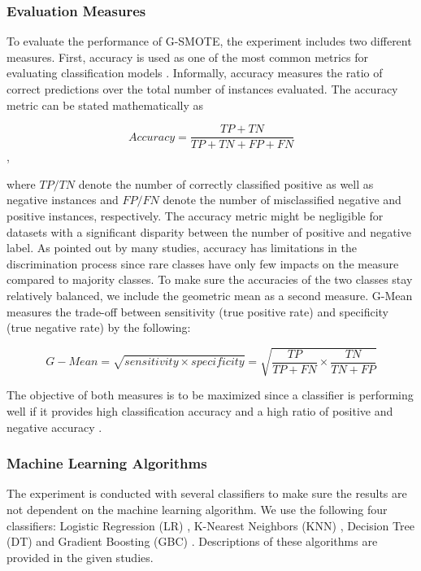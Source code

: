 \documentclass[parskip=full]{scrartcl}
\begin{document}
\subsubsection{Evaluation Measures}

To evaluate the performance of G-SMOTE, the experiment includes two different measures. First, accuracy is used as one of the most common metrics for evaluating classification models \cite{M.2015}. Informally, accuracy measures the ratio of correct predictions over the total number of instances evaluated. The accuracy metric can be stated mathematically as

\[Accuracy = \frac{TP + TN}{TP + TN + FP + FN}\],

where $\mathit{TP/TN}$ denote the number of correctly classified positive as well as negative instances and $\mathit{FP/FN}$ denote the number of misclassified negative and positive instances, respectively. The accuracy metric might be negligible for datasets with a significant disparity between the number of positive and negative label. As pointed out by many studies, accuracy has limitations in the discrimination process since rare classes have only few impacts on the measure compared to majority classes. To make sure the accuracies of the two classes stay relatively balanced, we include the geometric mean as a second measure. G-Mean measures the trade-off between sensitivity (true positive rate) and specificity (true negative rate) by the following:

\[G-Mean = \sqrt{sensitivity \times specificity} = \sqrt{\dfrac{TP}{TP + FN} \times \dfrac{TN}{TN + FP}}\]

The objective of both measures is to be maximized since a classifier is performing well if it provides high classification accuracy and a high ratio of positive and negative accuracy \cite{Han.2012}. 

\subsubsection{Machine Learning Algorithms}

The experiment is conducted with several classifiers to make sure the results are not dependent on the machine learning algorithm. We use the following four classifiers: Logistic Regression (LR) \cite{McCullagh.2019}, K-Nearest Neighbors (KNN) \cite{Cover.1967}, Decision Tree (DT) \cite{Salzberg.1994} and Gradient Boosting (GBC) \cite{Friedman.2001}. Descriptions of these algorithms are provided in the given studies.
\end{document}
